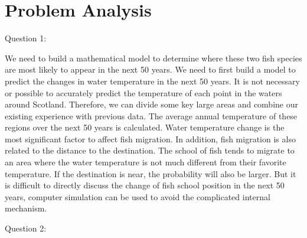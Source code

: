 \documentclass{mcmthesis}
\numberwithin{figure}{section}
\numberwithin{table}{section}
\begin{document}





\section{Problem Analysis}
Question 1: 

We need to build a mathematical model to determine where these two fish species are most likely to appear in the next 50 years. We need to first build a model to predict the changes in water temperature in the next 50 years. It is not necessary or possible to accurately predict the temperature of each point in the waters around Scotland. Therefore, we can divide some key large areas and combine our existing experience with previous data. The average annual temperature of these regions over the next 50 years is calculated. Water temperature change is the most significant factor to affect fish migration. In addition, fish migration is also related to the distance to the destination. The school of fish tends to migrate to an area where the water temperature is not much different from their favorite temperature. If the destination is near, the probability will also be larger. But it is difficult to directly discuss the change of fish school position in the next 50 years, computer simulation can be used to avoid the complicated internal mechanism.

Question 2:
\end{document}

